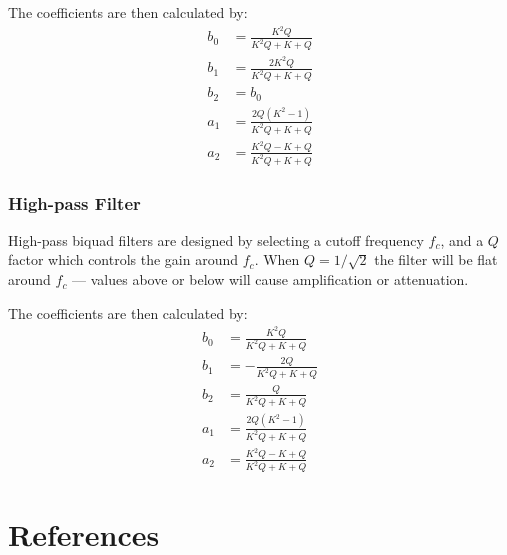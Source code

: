 \documentclass{article}
\begin{document}
The coefficients are then calculated by:
\begin{align}
    b_0 &= \frac{K^2Q}{K^2Q + K + Q}\\
    b_1 &= \frac{2K^2Q}{K^2Q + K + Q}\\
    b_2 &= b_0\\
    a_1 &= \frac{2Q(K^2 - 1)}{K^2Q + K + Q}\\
    a_2 &= \frac{K^2Q - K + Q}{K^2Q + K + Q}
\end{align}
\cite{Zolzer:2011}

\subsubsection{High-pass Filter}
High-pass biquad filters are designed by selecting a cutoff frequency $f_c$, and a $Q$ factor which controls the gain around $f_c$.
When $Q = 1/\sqrt 2$ the filter will be flat around $f_c$ --- values above or below will cause amplification or attenuation.

The coefficients are then calculated by:
\begin{align}
    b_0 &= \frac{K^2Q}{K^2Q + K + Q}\\
    b_1 &= - \frac{2Q}{K^2Q + K + Q}\\
    b_2 &= \frac{Q}{K^2Q + K + Q}\\
    a_1 &= \frac{2Q(K^2 - 1)}{K^2Q + K + Q}\\
    a_2 &= \frac{K^2Q - K + Q}{K^2Q + K + Q}
\end{align}
\cite{Zolzer:2011}

\section{References}
{}


\printindex
\end{document}
